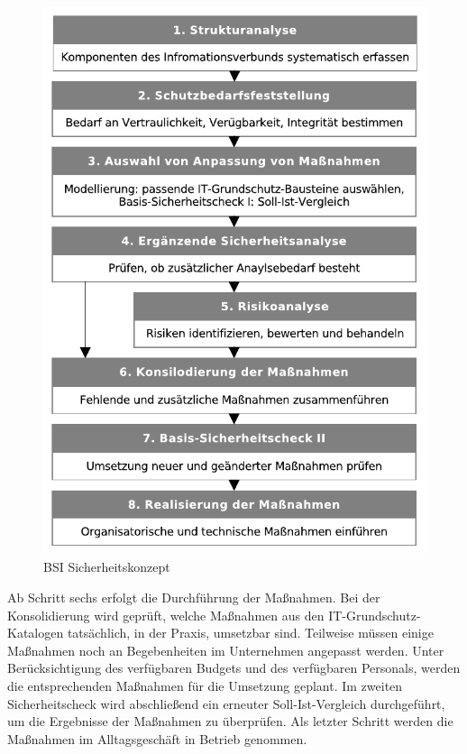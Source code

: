 \documentclass[11pt,a4paper]{report}
\begin{document}
\begin{figure}[htbp]
\centering
\includegraphics[scale=0.7]{images/bsi_sicherheitskonzept.pdf}
\caption[BSI Sicherheitskonzept]{BSI Sicherheitskonzept\footnotemark}
\label{fig:bsi_sicherheit}
\end{figure}
Ab Schritt sechs erfolgt die Durchführung der Maßnahmen. Bei der Konsolidierung wird geprüft, welche Maßnahmen aus den IT-Grundschutz-Katalogen tatsächlich, in der Praxis, umsetzbar sind. Teilweise müssen einige Maßnahmen noch an Begebenheiten im Unternehmen angepasst werden. Unter Berücksichtigung des verfügbaren Budgets und des verfügbaren Personals, werden die entsprechenden Maßnahmen für die Umsetzung geplant. Im zweiten Sicherheitscheck wird abschließend ein erneuter Soll-Ist-Vergleich durchgeführt, um die Ergebnisse der Maßnahmen zu überprüfen. Als letzter Schritt werden die Maßnahmen im Alltagsgeschäft in Betrieb genommen.
\end{document}
